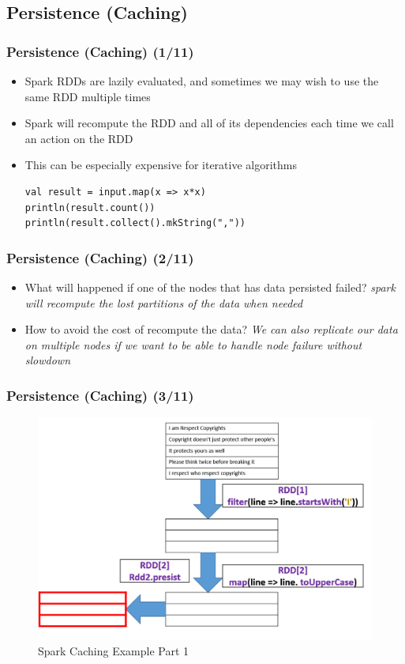 \subsection{Persistence (Caching)}
\begin{frame}[fragile]
	  \frametitle{Persistence (Caching) (1/11)}
\begin{itemize}[<+->]
\item Spark RDDs are lazily evaluated, and sometimes we may wish to use the same RDD multiple times
\item Spark will recompute the RDD and all of its dependencies each time we call an action on the RDD
\item This can be especially expensive for iterative algorithms
	\begin{lstlisting}[style=myScalastyle, caption=Motivation Example Persistence]
val result = input.map(x => x*x)
println(result.count())
println(result.collect().mkString(","))
	\end{lstlisting}
\end{itemize}
\end{frame}


\begin{frame}[fragile]
	\frametitle{Persistence (Caching) (2/11)}
	\begin{itemize}[<+->]

\item What will happened if one of the nodes that has data persisted failed? \textit{spark will recompute the lost partitions of the data when needed}

\item How to avoid the cost of recompute the data? \textit{We can also replicate our data on multiple nodes if we want to be able to handle node failure without slowdown}


\end{itemize}
\end{frame}

\begin{frame}
	  \frametitle{Persistence (Caching) (3/11)}
	    \begin{figure}
	  	\caption{Spark Caching Example Part 1}  		  	
			\includegraphics[width=\textwidth,height=6.5 cm]{Graphics/cashe1.PNG}
		\end{figure}
\end{frame}

